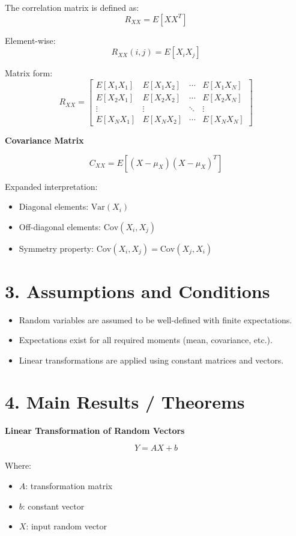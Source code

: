\documentclass[12pt]{article}
\begin{document}
The correlation matrix is defined as:
\[
R_{XX} = E[XX^T]
\]

Element-wise:
\[
R_{XX}(i,j) = E[X_i X_j]
\]

Matrix form:
\[
R_{XX} =
\begin{bmatrix}
E[X_1 X_1] & E[X_1 X_2] & \cdots & E[X_1 X_N] \\
E[X_2 X_1] & E[X_2 X_2] & \cdots & E[X_2 X_N] \\
\vdots & \vdots & \ddots & \vdots \\
E[X_N X_1] & E[X_N X_2] & \cdots & E[X_N X_N]
\end{bmatrix}
\]

\textbf{Covariance Matrix}

\[
C_{XX} = E[(X - \mu_X)(X - \mu_X)^T]
\]

Expanded interpretation:
\begin{itemize}
\item Diagonal elements: $\mathrm{Var}(X_i)$
\item Off-diagonal elements: $\mathrm{Cov}(X_i, X_j)$
\item Symmetry property: $\mathrm{Cov}(X_i, X_j) = \mathrm{Cov}(X_j, X_i)$
\end{itemize}

\section*{3. Assumptions and Conditions}

\begin{itemize}
\item Random variables are assumed to be well-defined with finite expectations.
\item Expectations exist for all required moments (mean, covariance, etc.).
\item Linear transformations are applied using constant matrices and vectors.
\end{itemize}

\section*{4. Main Results / Theorems}

\textbf{Linear Transformation of Random Vectors}

\[
Y = AX + b
\]

Where:
\begin{itemize}
\item $A$: transformation matrix
\item $b$: constant vector
\item $X$: input random vector
\end{itemize}
\end{document}

